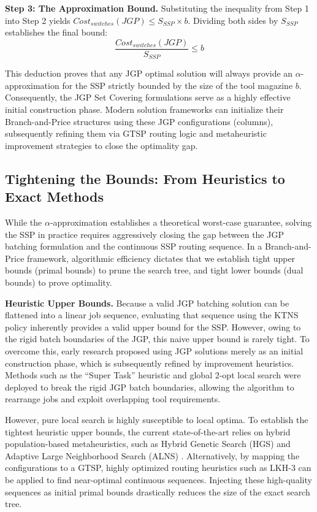 \documentclass[12pt]{article}
\begin{document}
\textbf{Step 3: The Approximation Bound.}
Substituting the inequality from Step 1 into Step 2 yields $Cost_{switches}(JGP) \le S_{SSP} \times b$. Dividing both sides by $S_{SSP}$ establishes the final bound:
\begin{equation}
	\frac{Cost_{switches}(JGP)}{S_{SSP}} \le b
\end{equation}

This deduction proves that any JGP optimal solution will always provide an $\alpha$-approximation for the SSP strictly bounded by the size of the tool magazine $b$. Consequently, the JGP Set Covering formulations serve as a highly effective initial construction phase. Modern solution frameworks can initialize their Branch-and-Price structures using these JGP configurations (columns), subsequently refining them via GTSP routing logic and metaheuristic improvement strategies to close the optimality gap.

\subsection{Tightening the Bounds: From Heuristics to Exact Methods}

While the $\alpha$-approximation establishes a theoretical worst-case guarantee, solving the SSP in practice requires aggressively closing the gap between the JGP batching formulation and the continuous SSP routing sequence. In a Branch-and-Price framework, algorithmic efficiency dictates that we establish tight upper bounds (primal bounds) to prune the search tree, and tight lower bounds (dual bounds) to prove optimality. 

\textbf{Heuristic Upper Bounds.} Because a valid JGP batching solution can be flattened into a linear job sequence, evaluating that sequence using the KTNS policy inherently provides a valid upper bound for the SSP. However, owing to the rigid batch boundaries of the JGP, this naive upper bound is rarely tight. To overcome this, early research proposed using JGP solutions merely as an initial construction phase, which is subsequently refined by improvement heuristics. Methods such as the ``Super Task'' heuristic \citep{Privault1995} and global 2-opt local search \citep{Crama1994} were deployed to break the rigid JGP batch boundaries, allowing the algorithm to rearrange jobs and exploit overlapping tool requirements. 

However, pure local search is highly susceptible to local optima. To establish the tightest heuristic upper bounds, the current state-of-the-art relies on hybrid population-based metaheuristics, such as Hybrid Genetic Search (HGS) \citep{Mecler2021} and Adaptive Large Neighborhood Search (ALNS) \citep{Beezao2017}. Alternatively, by mapping the configurations to a GTSP, highly optimized routing heuristics such as LKH-3 \citep{Helsgaun2015} can be applied to find near-optimal continuous sequences. Injecting these high-quality sequences as initial primal bounds drastically reduces the size of the exact search tree.
\end{document}
